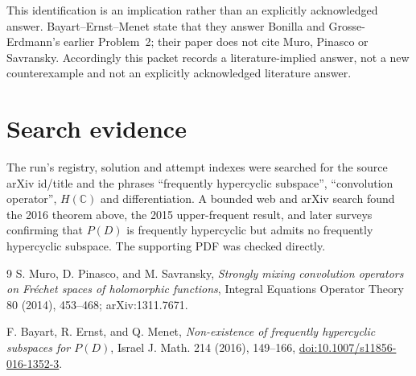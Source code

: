 \documentclass[11pt]{article}
\begin{document}
This identification is an implication rather than an explicitly acknowledged
answer.  Bayart--Ernst--Menet state that they answer Bonilla and
Grosse-Erdmann's earlier Problem~2; their paper does not cite Muro, Pinasco or
Savransky.  Accordingly this packet records a literature-implied answer, not
a new counterexample and not an explicitly acknowledged literature answer.

\section*{Search evidence}

The run's registry, solution and attempt indexes were searched for the source
arXiv id/title and the phrases ``frequently hypercyclic subspace'',
``convolution operator'', $H(\mathbb C)$ and differentiation.  A bounded web
and arXiv search found the 2016 theorem above, the 2015 upper-frequent result,
and later surveys confirming that $P(D)$ is frequently hypercyclic but admits
no frequently hypercyclic subspace.  The supporting PDF was checked directly.

\begin{thebibliography}{9}
S. Muro, D. Pinasco, and M. Savransky,
\emph{Strongly mixing convolution operators on Fr\'echet spaces of
holomorphic functions}, Integral Equations Operator Theory 80 (2014),
453--468; arXiv:1311.7671.

F. Bayart, R. Ernst, and Q. Menet,
\emph{Non-existence of frequently hypercyclic subspaces for $P(D)$},
Israel J. Math. 214 (2016), 149--166,
\href{https://doi.org/10.1007/s11856-016-1352-3}{doi:10.1007/s11856-016-1352-3}.
\end{thebibliography}
\end{document}
